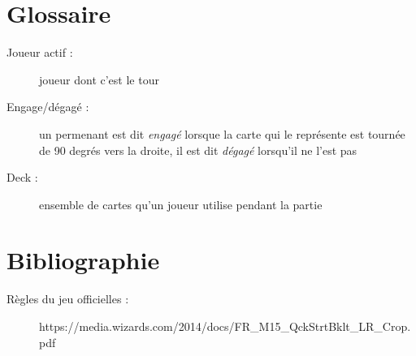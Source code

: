 \documentclass[a4paper,12pt]{article}
\begin{document}
%

\section{Glossaire}

\begin{description}
\item[Joueur actif :] joueur dont c'est le tour
\item[Engage/dégagé :] un permenant est dit \emph{engagé} lorsque la carte qui le représente est tournée de 90 degrés vers la droite, il est dit \emph{dégagé} lorsqu'il ne l'est pas
\item[Deck :] ensemble de cartes qu'un joueur utilise pendant la partie
\end{description}


\section{Bibliographie}

\begin{description}
\item[Règles du jeu officielles :] https://media.wizards.com/2014/docs/FR_M15_QckStrtBklt_LR_Crop.pdf

\end{description}
\end{document}
